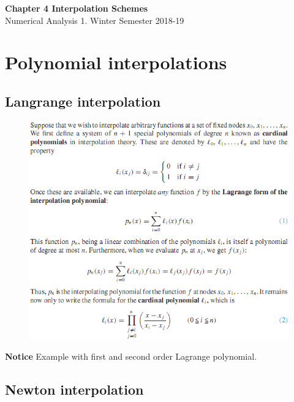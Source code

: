 \documentclass[12pt]{article}
\theoremstyle{theorem}
\begin{document}
\thispagestyle{empty}

\begin{center}
	{\LARGE \bf Chapter 4 Interpolation Schemes}\\[.2cm]
	{\large Numerical Analysis 1. Winter Semester 2018-19}
\end{center}

\section{Polynomial interpolations}

\subsection{Langrange interpolation}

\begin{figure}[h!]
\centering
\includegraphics[scale = 0.9]{Figures/12}
\label{Lagrange}
\end{figure}

\textbf{Notice} Example with first and second order Lagrange polynomial. 

\subsection{Newton interpolation}
\end{document}
